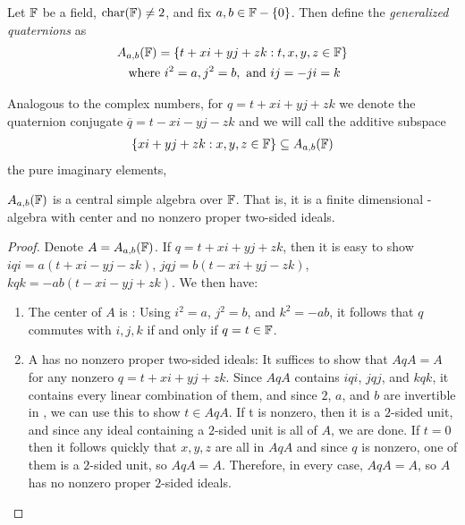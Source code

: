 \documentclass{amsart}
\begin{document}
\begin{defn}
    Let $\protect\mathbb{F}$ be a field, $\operatorname{char}(\protect\mathbb{F}) \neq 2$, and fix $a,b \in \protect\mathbb{F}-\{0\}$. Then define the \textit{generalized quaternions} as
\begin{gather*}
    A_{a,b}(\protect\mathbb{F}) = \{t + xi + yj + zk : t,x,y,z \in \protect\mathbb{F}\} \\
    \text{ where }i^2 =a, j^2 = b, \text{ and } ij = -ji=k
\end{gather*}
\end{defn}

Analogous to the complex numbers, for $q = t + xi + yj + zk$ we denote the quaternion conjugate $\overline{q} = t - xi - yj - zk$ and we will call the additive subspace 
\begin{align*}
    \{ xi + yj + zk : x, y, z \in \protect\mathbb{F} \} \subseteq A_{a,b}(\protect\mathbb{F})
\end{align*}
the pure imaginary elements,

\begin{theorem}
    $A_{a,b}(\protect\mathbb{F})$ is a central simple algebra over $\protect\mathbb{F}$. That is, it is a finite dimensional \bF-algebra with center \bF and no nonzero proper two-sided ideals.
\end{theorem}
\begin{proof}
    Denote $A = A_{a,b}(\protect\mathbb{F})$. If $q = t + xi + yj + zk$, then it is easy to show $iqi = a(t + xi -yj -zk)$, $jqj = b(t - xi + yj -zk)$, $kqk = -ab(t-xi-yj + zk)$. We then have:
    \begin{enumerate}
        \item The center of $A$ is \bF: Using $i^2 = a$, $j^2 = b$, and $k^2 = -ab$, it follows that $q$ commutes with $i, j, k$ if and only if $q = t \in \protect\mathbb{F}$.
        \item A has no nonzero proper two-sided ideals: It suffices to show that $AqA = A$ for any nonzero $q = t + xi + yj + zk$. Since $AqA$ contains $iqi$, $jqj$, and $kqk$, it contains every linear combination of them, and since $2$, $a$, and $b$ are invertible in \bF, we can use this to show $t \in AqA$. If t is nonzero, then it is a $2$-sided unit, and since any ideal containing a $2$-sided unit is all of $A$, we are done. If $t = 0$ then it follows quickly that $x, y, z$ are all in $AqA$ and since $q$ is nonzero, one of them is a $2$-sided unit, so $AqA = A$. Therefore, in every case, $AqA = A$, so $A$ has no nonzero proper $2$-sided ideals.
    \end{enumerate}
\end{proof}
\end{document}
